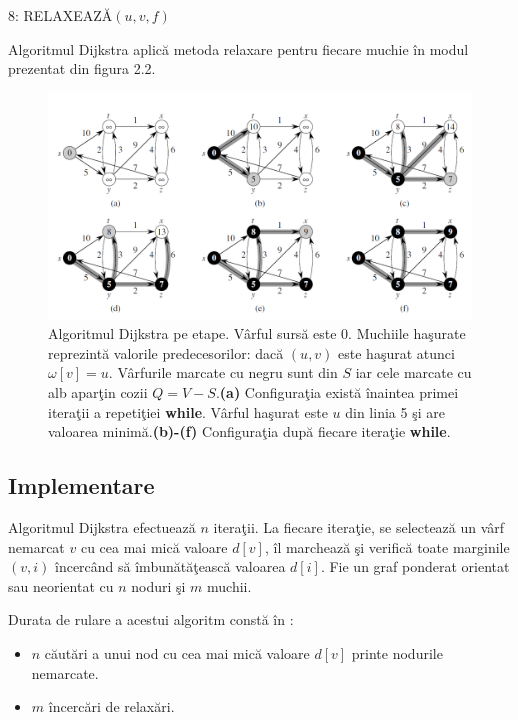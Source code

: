 \documentclass[11pt,a4paper]{report}
\begin{document}
    8:\hspace{1.2cm} RELAXEAZ\u A$(u,v,f)$
    \vspace{0.3cm}
    
    
    Algoritmul Dijkstra aplic\u a metoda relaxare pentru fiecare muchie \^ in modul prezentat din figura 2.2.
    \begin{figure}[!hbt]
    	\centering
    	\includegraphics[width=13.2cm]{Dijkstra.png}
    	\caption{\cite{Cormen} Algoritmul Dijkstra pe etape. V\^ arful surs\u a este 0. Muchiile ha\c surate reprezint\u a valorile predecesorilor: dac\u a $(u,v)$ este ha\c surat atunci $\omega[v]=u$. V\^ arfurile marcate cu negru sunt din $S$ iar cele marcate cu alb apar\c tin cozii $Q=V-S$.\textbf{(a)} Configura\c tia exist\u a \^ inaintea primei itera\c tii a repeti\c tiei \textbf{while}. V\^ arful ha\c surat este $u$ din linia 5 \c si are valoarea minim\u a.\textbf{(b)-(f)} Configura\c tia dup\u a fiecare itera\c tie \textbf{while}.}
    \end{figure}

   \subsection{Implementare}
   
   
   Algoritmul Dijkstra efectueaz\u a $n$ itera\c tii. La fiecare itera\c tie, se selecteaz\u a un v\^ arf nemarcat $v$ cu cea mai mic\u a valoare $d[v]$, \^ il marcheaz\u a \c si verific\u a toate marginile $(v,i)$ \^ incerc\^ and s\u a \^ imbun\u at\u a\c teasc\u a valoarea $d[i]$. Fie un graf ponderat orientat sau neorientat cu $n$ noduri \c si $m$ muchii. 
   
   Durata de rulare a acestui algoritm const\u a \^ in :
   \begin{itemize}
   	\item $n$ c\u aut\u ari a unui nod cu cea mai mic\u a valoare $d[v]$ printe nodurile nemarcate.
   	\item $m$ \^ incerc\u ari de relax\u ari.
   \end{itemize}
\end{document}
